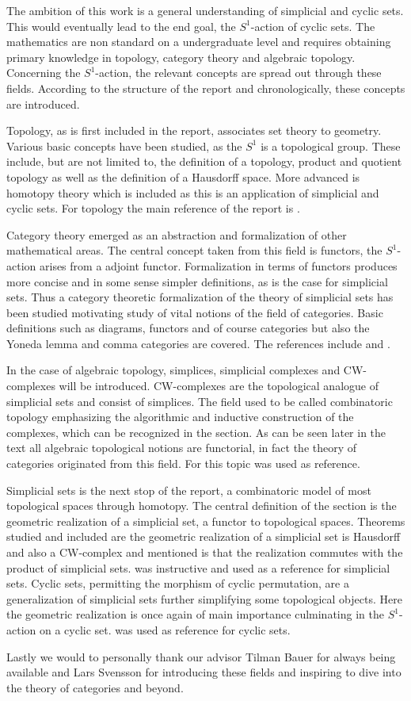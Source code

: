 \documentclass[../../main.tex]{subfiles}
\begin{document}
    The ambition of this work is a general understanding of simplicial and cyclic sets. This would eventually lead to the end goal, the $S^1$-action of cyclic sets. The mathematics are non standard on a undergraduate level and requires obtaining primary knowledge in topology, category theory and algebraic topology. Concerning the $S^1$-action, the relevant concepts are spread out through these fields. According to the structure of the report and chronologically, these concepts are introduced. 

    Topology, as is first included in the report, associates set theory to geometry. Various basic concepts have been studied, as the $S^1$ is a topological group. These include, but are not limited to, the definition of a topology, product and quotient topology as well as the definition of a Hausdorff space. More advanced is homotopy theory which is included as this is an application of simplicial and cyclic sets. For topology the main reference of the report is \cite{armstrong-basictop}.    

    Category theory emerged as an abstraction and formalization of other mathematical areas. The central concept taken from this field is functors, the $S^1$-action arises from a adjoint functor. Formalization in terms of functors produces more concise and in some sense simpler definitions, as is the case for simplicial sets. Thus a category theoretic formalization of the theory of simplicial sets has been studied motivating study of vital notions of the field of categories. Basic definitions such as diagrams, functors and of course categories but also the Yoneda lemma and comma categories are covered. The references include \cite{simp-maye} and \cite{cate-mac}.

    In the case of algebraic topology, simplices, simplicial complexes and CW-complexes will be introduced. CW-complexes are the topological analogue of simplicial sets and consist of simplices. The field used to be called combinatoric topology emphasizing the algorithmic and inductive construction of the complexes, which can be recognized in the section. As can be seen later in the text all algebraic topological notions are functorial, in fact the theory of categories originated from this field. For this topic \cite{simp-maye} was used as reference.

    Simplicial sets is the next stop of the report, a combinatoric model of most topological spaces through homotopy. The central definition of the section is the geometric realization of a simplicial set, a functor to topological spaces. Theorems studied and included are the geometric realization of a simplicial set is Hausdorff and also a CW-complex and mentioned is that the realization commutes with the product of simplicial sets. \cite{luk-simp} was instructive and used as a reference for simplicial sets. Cyclic sets, permitting the morphism of cyclic permutation, are a generalization of simplicial sets further simplifying some topological objects. Here the geometric realization is once again of main importance culminating in the $S^1$-action on a cyclic set. \cite{loday-cyclic} was used as reference for cyclic sets.

    Lastly we would to personally thank our advisor Tilman Bauer for always being available and Lars Svensson for introducing these fields and inspiring to dive into the theory of categories and beyond.
    
\end{document}
